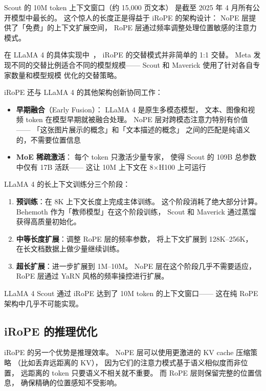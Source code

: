 Scout 的 10M token 上下文窗口（约 15,000 页文本）
是截至 2025 年 4 月所有公开模型中最长的。
这个惊人的长度正是得益于 iRoPE 的架构设计：
NoPE 层提供了「免费」的上下文扩展空间，
RoPE 层通过频率调整处理位置敏感的注意力模式。

在 LLaMA 4 的具体实现中~\cite{meta2025llama4}，
iRoPE 的交替模式并非简单的 1:1 交替。
Meta 发现不同的交替比例适合不同的模型规模——
Scout 和 Maverick 使用了针对各自专家数量和模型规模
优化的交替策略。

iRoPE 还与 LLaMA 4 的其他架构创新协同工作：
\begin{itemize}[noitemsep]
  \item \textbf{早期融合}（Early Fusion）：
        LLaMA 4 是原生多模态模型，
        文本、图像和视频 token 在模型早期就被融合处理。
        NoPE 层对跨模态注意力特别有价值——
        「这张图片展示的概念」和「文本描述的概念」
        之间的匹配是纯语义的，不需要位置信息
  \item \textbf{MoE 稀疏激活}：
        每个 token 只激活少量专家，
        使得 Scout 的 109B 总参数中仅有 17B 活跃——
        这让 10M 上下文在 8$\times$H100 上可运行
\end{itemize}

\begin{keybox}
LLaMA 4 的长上下文训练分三个阶段：
\begin{enumerate}[noitemsep]
  \item \textbf{预训练}：在 8K 上下文长度上完成主体训练。
        这个阶段消耗了绝大部分计算。
        Behemoth 作为「教师模型」在这个阶段训练，
        Scout 和 Maverick 通过蒸馏获得高质量初始化。
  \item \textbf{中等长度扩展}：调整 RoPE 层的频率参数，
        将上下文扩展到 128K--256K，
        在长文档数据上做少量继续训练。
  \item \textbf{超长扩展}：进一步扩展到 1M--10M。
        NoPE 层在这个阶段几乎不需要适应，
        RoPE 层通过 YaRN 风格的频率操控进行扩展。
\end{enumerate}
LLaMA 4 Scout 通过 iRoPE 达到了 10M token 的上下文窗口——
这在纯 RoPE 架构中几乎不可能实现。
\end{keybox}

\subsection{iRoPE 的推理优化}

iRoPE 的另一个优势是推理效率。
NoPE 层可以使用更激进的 KV cache 压缩策略
（比如丢弃远距离的 KV），
因为它们的注意力模式基于语义相似度而非位置，
远距离的 token 只要语义不相关就不重要。
而 RoPE 层则保留完整的位置信息，
确保精确的位置感知不受影响。

